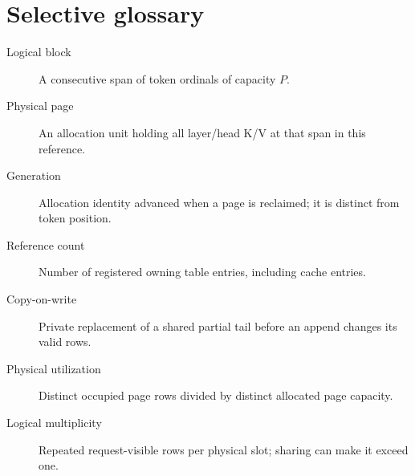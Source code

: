 \section{Selective glossary}
\begin{description}
\item[Logical block] A consecutive span of token ordinals of capacity $P$.
\item[Physical page] An allocation unit holding all layer/head K/V at that span in this reference.
\item[Generation] Allocation identity advanced when a page is reclaimed; it is distinct from token position.
\item[Reference count] Number of registered owning table entries, including cache entries.
\item[Copy-on-write] Private replacement of a shared partial tail before an append changes its valid rows.
\item[Physical utilization] Distinct occupied page rows divided by distinct allocated page capacity.
\item[Logical multiplicity] Repeated request-visible rows per physical slot; sharing can make it exceed one.
\end{description}

